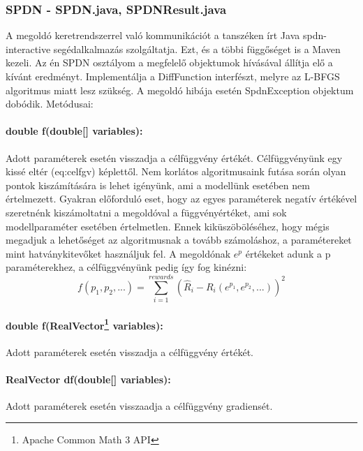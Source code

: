 \subsubsection{SPDN - SPDN.java, SPDNResult.java}
A megoldó keretrendszerrel való kommunikációt a tanszéken írt Java spdn-interactive segédalkalmazás szolgáltatja. %
Ezt, és a többi függőséget is a Maven kezeli. Az én SPDN osztályom a megfelelő objektumok hívásával állítja elő a kívánt eredményt. Implementálja a DiffFunction interfészt, melyre az L-BFGS algoritmus miatt lesz szükség. A megoldó hibája esetén SpdnException objektum dobódik. %
Metódusai:
\paragraph{double f(double[] variables):} Adott paraméterek esetén visszadja a célfüggvény értékét. Célfüggvényünk egy kissé eltér \aref({eq:celfgv}) képlettől. Nem korlátos algoritmusaink futása során olyan pontok kiszámítására is lehet igényünk, ami a modellünk esetében nem értelmezett. Gyakran előforduló eset, hogy az egyes paraméterek negatív értékével szeretnénk kiszámoltatni a megoldóval a függvényértéket, ami sok modellparaméter esetében értelmetlen. Ennek kiküszöböléséhez, hogy mégis megadjuk a lehetőséget az algoritmusnak a tovább számoláshoz, a paramétereket mint hatványkitevőket használjuk fel. A megoldónak $e^p$ értékeket adunk a p paraméterekhez, a célfüggvényünk pedig így fog kinézni:
$$ f(p_1,p_2,...)=\sum_{i=1}^{rewards}\left(\hat{R}_i-R_i(e^{p_1},e^{p_2},...)\right) ^2$$
\paragraph[double f(RealVector variables]{double f(RealVector\footnote{Apache Common Math 3 API} variables):} Adott paraméterek esetén visszadja a célfüggvény értékét.
\paragraph{RealVector df(double[] variables):} Adott paraméterek esetén visszaadja a célfüggvény gradiensét.
